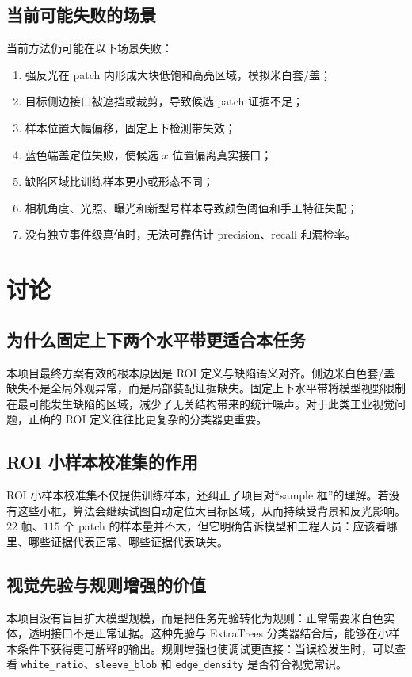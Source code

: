 \documentclass[a4paper,12pt]{article}
\newcommand{\code}[1]{\texttt{#1}}
\begin{document}
\subsection{当前可能失败的场景}
当前方法仍可能在以下场景失败：
\begin{enumerate}[label=\arabic*.]
    \item 强反光在 patch 内形成大块低饱和高亮区域，模拟米白套/盖；
    \item 目标侧边接口被遮挡或裁剪，导致候选 patch 证据不足；
    \item 样本位置大幅偏移，固定上下检测带失效；
    \item 蓝色端盖定位失败，使候选 $x$ 位置偏离真实接口；
    \item 缺陷区域比训练样本更小或形态不同；
    \item 相机角度、光照、曝光和新型号样本导致颜色阈值和手工特征失配；
    \item 没有独立事件级真值时，无法可靠估计 precision、recall 和漏检率。
\end{enumerate}

\section{讨论}
\subsection{为什么固定上下两个水平带更适合本任务}
本项目最终方案有效的根本原因是 ROI 定义与缺陷语义对齐。侧边米白色套/盖缺失不是全局外观异常，而是局部装配证据缺失。固定上下水平带将模型视野限制在最可能发生缺陷的区域，减少了无关结构带来的统计噪声。对于此类工业视觉问题，正确的 ROI 定义往往比更复杂的分类器更重要。

\subsection{ROI 小样本校准集的作用}
ROI 小样本校准集不仅提供训练样本，还纠正了项目对“sample 框”的理解。若没有这些小框，算法会继续试图自动定位大目标区域，从而持续受背景和反光影响。$22$ 帧、$115$ 个 patch 的样本量并不大，但它明确告诉模型和工程人员：应该看哪里、哪些证据代表正常、哪些证据代表缺失。

\subsection{视觉先验与规则增强的价值}
本项目没有盲目扩大模型规模，而是把任务先验转化为规则：正常需要米白色实体，透明接口不是正常证据。这种先验与 ExtraTrees 分类器结合后，能够在小样本条件下获得更可解释的输出。规则增强也使调试更直接：当误检发生时，可以查看 \code{white\_ratio}、\code{sleeve\_blob} 和 \code{edge\_density} 是否符合视觉常识。
\end{document}
